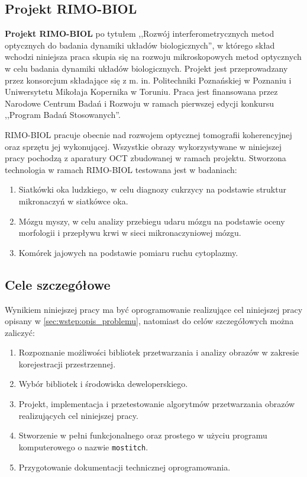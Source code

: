 \subsection{Projekt RIMO-BIOL}
\label{sec:wstep:rimo-biol}

\textbf{Projekt RIMO-BIOL} po tytułem ,,Rozwój interferometrycznych metod optycznych do badania dynamiki układów biologicznych'', w którego skład wchodzi niniejsza praca skupia się na rozwoju mikroskopowych metod optycznych w celu badania dynamiki układów biologicznych. Projekt jest przeprowadzany przez konsorcjum składające się z m. in. Politechniki Poznańskiej w Poznaniu i Uniwersytetu Mikołaja Kopernika w Toruniu. Praca jest finansowana przez Narodowe Centrum Badań i Rozwoju w ramach pierwszej edycji konkursu ,,Program Badań Stosowanych''.

RIMO-BIOL pracuje obecnie nad rozwojem optycznej tomografii koherencyjnej oraz sprzętu jej wykonującej. Wszystkie obrazy wykorzystywane w niniejszej pracy pochodzą z aparatury OCT zbudowanej w ramach projektu. Stworzona technologia w ramach RIMO-BIOL testowana jest w  badaniach:

\begin{enumerate}
\item Siatkówki oka ludzkiego, w celu diagnozy cukrzycy na podstawie struktur mikronaczyń w siatkówce oka.
\item Mózgu myszy, w celu analizy przebiegu udaru mózgu na podstawie oceny morfologii i przepływu krwi w sieci mikronaczyniowej mózgu.
\item Komórek jajowych na podstawie pomiaru ruchu cytoplazmy.
\end{enumerate}

\subsection{Cele szczegółowe}
\label{sec:wstep:cele_szczegolowe}

Wynikiem niniejszej pracy ma być oprogramowanie realizujące cel niniejszej pracy opisany w \ref{sec:wstep:opis_problemu}, natomiast do celów szczegółowych można zaliczyć:

\begin{enumerate}
\item Rozpoznanie możliwości bibliotek przetwarzania i analizy obrazów w zakresie korejestracji przestrzennej.
\item Wybór bibliotek i środowiska deweloperskiego.
\item Projekt, implementacja i przetestowanie algorytmów przetwarzania obrazów realizujących cel niniejszej pracy.
\item Stworzenie w pełni funkcjonalnego oraz prostego w użyciu programu komputerowego o nazwie \texttt{mostitch}.
\item Przygotowanie dokumentacji technicznej oprogramowania.
\end{enumerate}

